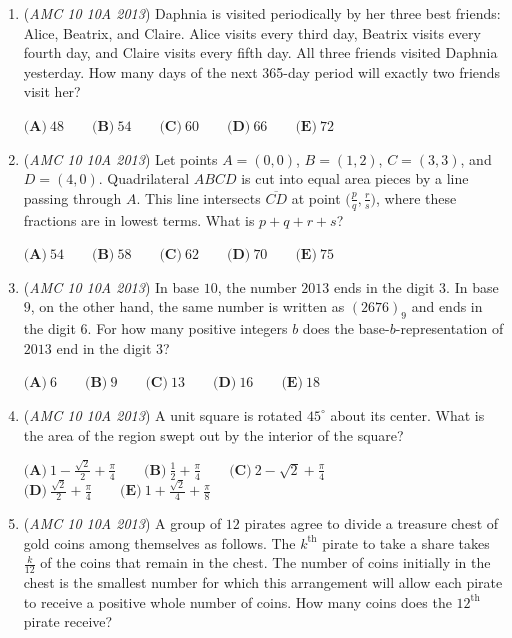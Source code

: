 \begin{enumerate}
 $\textbf{(A)}\ 9 \qquad\textbf{(B)}\ \frac{28}{3} \qquad\textbf{(C)}\ 10 \qquad\textbf{(D)}\ \frac{31}{3} \qquad\textbf{(E)}\ \frac{32}{3}$


	\item (\textit{AMC 10 10A 2013}) Daphnia is visited periodically by her three best friends: Alice, Beatrix, and Claire.  Alice visits every third day, Beatrix visits every fourth day, and Claire visits every fifth day.  All three friends visited Daphnia yesterday.  How many days of the next 365-day period will exactly two friends visit her?


 $\textbf{(A)}\ 48\qquad\textbf{(B)}\ 54\qquad\textbf{(C)}\ 60\qquad\textbf{(D)}\ 66\qquad\textbf{(E)}\ 72$


	\item (\textit{AMC 10 10A 2013}) Let points $A = (0, 0)$, $B = (1, 2)$, $C=(3, 3)$, and $D = (4, 0)$.  Quadrilateral $ABCD$ is cut into equal area pieces by a line passing through $A$.  This line intersects $\overline{CD}$ at point $\bigg(\frac{p}{q}, \frac{r}{s}\bigg)$, where these fractions are in lowest terms.  What is $p+q+r+s$?


 $\textbf{(A)}\ 54\qquad\textbf{(B)}\ 58\qquad\textbf{(C)}\ 62\qquad\textbf{(D)}\ 70\qquad\textbf{(E)}\ 75$


	\item (\textit{AMC 10 10A 2013}) In base $10$, the number $2013$ ends in the digit $3$.  In base $9$, on the other hand, the same number is written as $(2676)_{9}$ and ends in the digit $6$.  For how many positive integers $b$ does the base-$b$-representation of $2013$ end in the digit $3$?


 $\textbf{(A)}\ 6\qquad\textbf{(B)}\ 9\qquad\textbf{(C)}\ 13\qquad\textbf{(D)}\ 16\qquad\textbf{(E)}\ 18$


	\item (\textit{AMC 10 10A 2013}) A unit square is rotated $45^\circ$ about its center.  What is the area of the region swept out by the interior of the square?


 $\textbf{(A)}\ 1 - \frac{\sqrt2}{2} + \frac{\pi}{4}\qquad\textbf{(B)}\ \frac{1}{2} + \frac{\pi}{4} \qquad\textbf{(C)}\ 2 - \sqrt2 + \frac{\pi}{4}$
$\textbf{(D)}\ \frac{\sqrt2}{2} + \frac{\pi}{4} \qquad\textbf{(E)}\ 1 + \frac{\sqrt2}{4} + \frac{\pi}{8}$


	\item (\textit{AMC 10 10A 2013}) A group of $12$ pirates agree to divide a treasure chest of gold coins among themselves as follows.  The $k^{\text{th}}$ pirate to take a share takes $\frac{k}{12}$ of the coins that remain in the chest.  The number of coins initially in the chest is the smallest number for which this arrangement will allow each pirate to receive a positive whole number of coins.  How many coins does the $12^{\text{th}}$ pirate receive?



\end{enumerate}
